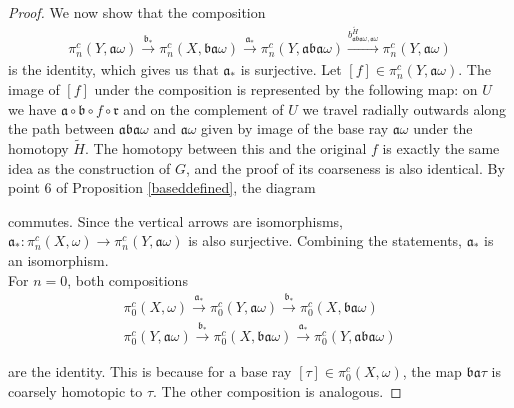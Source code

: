 \documentclass[a4paper,11pt]{article}
\theoremstyle{definition}
\theoremstyle{plain}
\theoremstyle{remark}
\begin{document}
\begin{proof}
We now show that the composition 
\begin{align*}
\pi_n^c(Y,\mathfrak{a} \omega) \xrightarrow{\mathfrak{b}_{*}}\pi_n^c(X,\mathfrak{b}\mathfrak{a}\omega) \xrightarrow{\mathfrak{a}_{*}} \pi_{n}^{c}(Y,\mathfrak{a}\mathfrak{b}\mathfrak{a}\omega) \xrightarrow{b_{\mathfrak{a}\mathfrak{b}\mathfrak{a}\omega,\mathfrak{a}\omega}^{\tilde{H}}} \pi_{n}^{c}(Y,\mathfrak{a}\omega)
\end{align*}
is the identity, which gives us that $\mathfrak{a}_{*}$ is surjective. Let $[f]\in \pi_n^c(Y, \mathfrak{a}\omega)$. The image of $[f]$ under the composition is represented by the following map: on $U$ we have $\mathfrak{a}\circ \mathfrak{b}\circ f \circ \mathfrak{r}$ and on the complement of $U$ we travel radially outwards along the path between $\mathfrak{a}\mathfrak{b}\mathfrak{a}\omega$ and $\mathfrak{a}\omega$ given by image of the base ray $\mathfrak{a}\omega$ under the homotopy $\tilde{H}$. The homotopy between this and the original $f$ is exactly the same idea as the construction of $G$, and the proof of its coarseness is also identical. By point $6$ of Proposition \ref{baseddefined}, the diagram

\begin{figure}[H]
\center
{}
\end{figure}

commutes. Since the vertical arrows are isomorphisms, $\mathfrak{a}_{*}: \pi_{n}^{c}(X,\omega)\rightarrow \pi_n^{c}(Y,\mathfrak{a}\omega)$ is also surjective. Combining the statements, $\mathfrak{a}_{*}$ is an isomorphism. \\

For $n=0$, both compositions
\begin{align*}
 \pi_{0}^c(X,\omega)\xrightarrow{\mathfrak{a}_{*}} \pi_0^c(Y,\mathfrak{a} \omega) \xrightarrow{\mathfrak{b}_{*}}\pi_0^c(X,\mathfrak{b}\mathfrak{a}\omega)  \\
\pi_0^c(Y,\mathfrak{a} \omega) \xrightarrow{\mathfrak{b}_{*}}\pi_0^c(X,\mathfrak{b}\mathfrak{a}\omega) \xrightarrow{\mathfrak{a}_{*}} \pi_{0}^{c}(Y,\mathfrak{a}\mathfrak{b}\mathfrak{a}\omega) 
\end{align*}

are the identity. This is because for a base ray $[\tau] \in \pi^c_{0}(X,\omega)$, the map $\mathfrak{b}\mathfrak{a}\tau$ is coarsely homotopic to $\tau$. The other composition is analogous.


 \end{proof}
\end{document}
